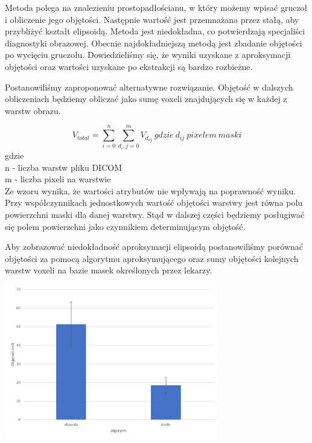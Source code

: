 \documentclass[a4paper,11pt,twoside]{report}
\theoremstyle{definition}
\begin{document}
Metoda polega na znalezieniu prostopadłościanu, w który możemy wpisać gruczoł i obliczenie jego objętości. Następnie wartość jest przemnażana przez stałą, aby przybliżyć kształt elipsoidą. Metoda jest niedokładna, co potwierdzają specjaliści diagnostyki obrazowej. Obecnie najdokładniejszą metodą jest zbadanie objętości po wycięciu gruczołu. Dowiedzieliśmy się, że wyniki uzyskane z aproksymacji objętości oraz wartości uzyskane po ekstrakcji są bardzo rozbieżne. 
\par
Postanowiliśmy zaproponować alternatywne rozwiązanie. Objętość w dalszych obliczeniach będziemy obliczać jako sumę voxeli znajdujących się w każdej z warstw obrazu. 

\[ V_{total} = \sum_{i=0}^{n} \sum_{d_i, j=0}^{m} V_{d_{ij}} \ gdzie\ d_{ij}\ pixelem\ maski \]
gdzie \\
n - liczba warstw pliku DICOM \\
m - liczba pixeli na warstwie \\

Ze wzoru wynika, że wartości atrybutów nie wpływają na poprawność wyniku. Przy współczynnikach jednostkowych wartość objętości warstwy jest równa polu powierzchni maski dla danej warstwy. Stąd w dalszej części będziemy posługiwać się polem powierzchni jako czynnikiem determinującym objętość.

Aby zobrazować niedokładność aproksymacji elipsoidą postanowiliśmy porównać objętości za pomocą algorytmu aproksymującego oraz sumy objętości kolejnych warstw voxeli na bazie masek określonych przez lekarzy. 

\begin{minipage}[h]{\linewidth}
	\centering
	\includegraphics[width=0.7\textwidth]{WstepObjetosc.png}
\end{minipage}
\end{document}

